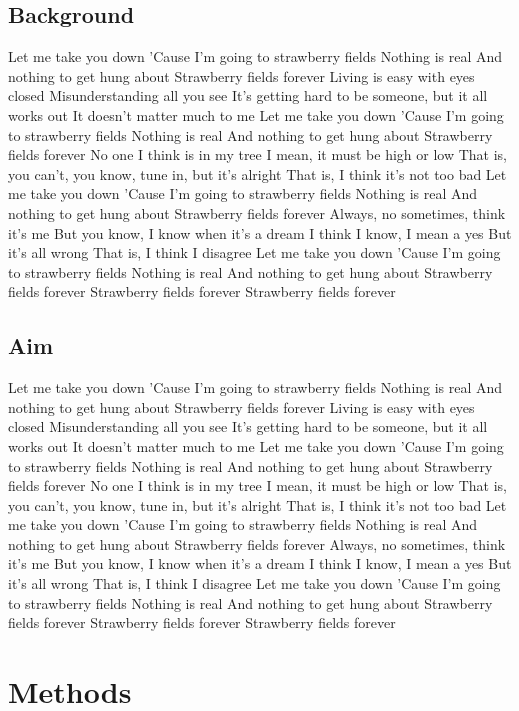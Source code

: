 \documentclass[12pt]{article}
\begin{document}
\subsection{Background}

\bigskip
Let me take you down
'Cause I'm going to strawberry fields
Nothing is real
And nothing to get hung about
Strawberry fields forever
Living is easy with eyes closed
Misunderstanding all you see
It's getting hard to be someone, but it all works out
It doesn't matter much to me
Let me take you down
'Cause I'm going to strawberry fields
Nothing is real
And nothing to get hung about
Strawberry fields forever
No one I think is in my tree
I mean, it must be high or low
That is, you can't, you know, tune in, but it's alright
That is, I think it's not too bad
Let me take you down
'Cause I'm going to strawberry fields
Nothing is real
And nothing to get hung about
Strawberry fields forever
Always, no sometimes, think it's me
But you know, I know when it's a dream
I think I know, I mean a yes
But it's all wrong
That is, I think I disagree
Let me take you down
'Cause I'm going to strawberry fields
Nothing is real
And nothing to get hung about
Strawberry fields forever
Strawberry fields forever
Strawberry fields forever

\subsection{Aim}
Let me take you down
'Cause I'm going to strawberry fields
Nothing is real
And nothing to get hung about
Strawberry fields forever
Living is easy with eyes closed
Misunderstanding all you see
It's getting hard to be someone, but it all works out
It doesn't matter much to me
Let me take you down
'Cause I'm going to strawberry fields
Nothing is real
And nothing to get hung about
Strawberry fields forever
No one I think is in my tree
I mean, it must be high or low
That is, you can't, you know, tune in, but it's alright
That is, I think it's not too bad
Let me take you down
'Cause I'm going to strawberry fields
Nothing is real
And nothing to get hung about
Strawberry fields forever
Always, no sometimes, think it's me
But you know, I know when it's a dream
I think I know, I mean a yes
But it's all wrong
That is, I think I disagree
Let me take you down
'Cause I'm going to strawberry fields
Nothing is real
And nothing to get hung about
Strawberry fields forever
Strawberry fields forever
Strawberry fields forever

\section{Methods}
\end{document}
